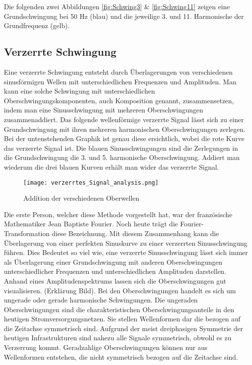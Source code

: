 Die folgenden zwei Abbildungen \ref{fig:Schwing3} \& \ref{fig:Schwing11} zeigen eine Grundschwingung bei 50 Hz (blau) und die jeweilige 3. und 11. Harmonische der Grundfrequenz (gelb).

\subsection{Verzerrte Schwingung}
Eine verzerrte Schwingung entsteht durch Überlagerungen von verschiedenen sinusförmigen Wellen mit unterschiedlichen Frequenzen und Amplituden. Man kann eine solche Schwingung mit unterschiedlichen Oberschwingungskomponenten, auch Komposition genannt, zusammensetzen, indem man eine Sinusschwingung mit mehreren Oberschwingungen zusammenaddiert. Das folgende wellenförmige verzerrte Signal lässt sich zu einer Grundschwingung mit ihren mehreren harmonischen Oberschwingungen zerlegen. Bei der untenstehenden Graphik ist genau diese ersichtlich, wobei die rote Kurve das verzerrte Signal ist. Die blauen Sinusschwingungen sind die Zerlegungen in die Grundschwingung die 3. und 5. harmonische Oberschwingung. Addiert man wiederum die drei blauen Kurven erhält man wider das verzerrte Signal.   

\begin{figure}[ht!]
	\centering
	\texttt{[image: verzerrtes\_Signal\_analysis.png]}	
	\caption{Addition der verschiedenen Oberwellen \cite{analysi3}}\label{fig:Addition Oberwellen}
\end{figure}


Die erste Person, welcher diese Methode vorgestellt hat, war der französische Mathematiker Jean Baptiste Fourier. Noch heute trägt die Fourier-Transformation diese Bezeichnung. Mit diesem Zusammenhang kann die Überlagerung von einer perfekten Sinuskurve zu einer verzerrten Sinusschwingung führen. Dies Bedeutet so viel wie, eine verzerrte Sinusschwingung lässt sich immer als Überlagerung einer Grundschwingung mit anderen Oberschwingungen unterschiedlicher Frequenzen und unterschiedlichen Amplituden darstellen. Anhand eines Amplitudenspektrums lassen sich die Oberschwingungen gut visualisieren. (Erklärung Bild).
Bei den Oberschwingungen handelt es sich um ungerade oder gerade harmonische Schwingungen.
Die ungeraden Oberschwingungen sind die charakteristischen Oberschwingungsanteile in den heutigen Stromversorgungsnetzen. Sie stellen Wellenformen dar die bezogen auf die Zeitachse symmetrisch sind. Aufgrund der meist dreiphasigen Symmetrie der heutigen Infrastrukturen sind nahezu alle Signale symmetrisch, obwohl es zu Verzerrung kommt. Geradzahlige Oberschwingungen können nur aus Wellenformen entstehen, die nicht symmetrisch bezogen auf die Zeitachse sind.

